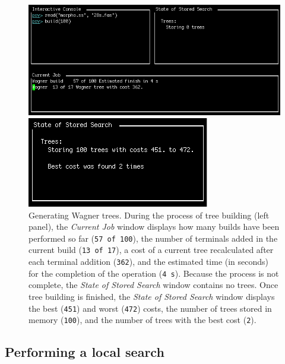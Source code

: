 \begin{figure}
\centering
\begin{minipage}[c]{0.507\textwidth}
   		\includegraphics[width=\textwidth]{figures/building1.jpg}
\end{minipage}%
\quad
\begin{minipage}[c]{0.453\textwidth}
	   	\includegraphics[width=\textwidth]{figures/building2.jpg}
   	\end{minipage}
\caption{Generating Wagner trees. During the process of tree building (left panel), the \emph{Current Job} window displays how many builds have been performed so far (\texttt{57 of 100}), the number of terminals added in the current build (\texttt{13 of 17}), a cost of a current tree recalculated after each terminal addition (\texttt{362}), and the estimated time (in seconds) for the completion of the operation (\texttt{4 s}). Because the process is not complete, the \emph{State of Stored Search} window contains no trees. Once tree building is finished, the \emph{State of Stored Search} window displays the best (\texttt{451}) and worst (\texttt{472}) costs, the number of trees stored in memory (\texttt{100}), and the number of trees with the best cost (\texttt{2}).} 
\label{fig:building}
\end{figure}

\subsection{Performing a local search}

